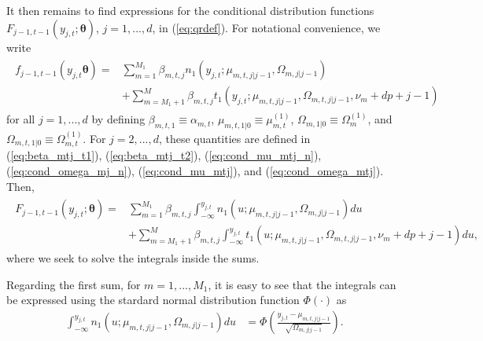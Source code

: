 \documentclass[nojss]{jss}
\begin{document}
\begin{appendix}
It then remains to find expressions for the conditional distribution functions $F_{j-1,t-1}(y_{j,t};\boldsymbol{\theta})$, $j=1,...,d$, in (\ref{eq:qrdef}).  For notational convenience, we write
\begin{align}
\begin{aligned}
f_{j-1,t-1}(y_{j,t}\boldsymbol{\theta}) =& \sum_{m=1}^{M_1}\beta_{m,t,j}n_1(y_{j,t};\mu_{m,t,j|j-1},\Omega_{m,j|j-1}) \\
&+ \sum_{m=M_1 + 1}^{M}\beta_{m,t,j}t_1(y_{j,t};\mu_{m,t,j|j-1},\Omega_{m,t,j|j-1},\nu_m + dp + j - 1)
\end{aligned}
\end{align}
for all $j=1,...,d$ by defining $\beta_{m,t,1}\equiv \alpha_{m,t}$,  $\mu_{m,t,1|0}\equiv \mu_{m,t}^{(1)}$,  $\Omega_{m,1|0}\equiv \Omega_{m}^{(1)}$, and $\Omega_{m,t,1|0}\equiv \Omega_{m,t}^{(1)}$.  For $j=2,...,d$,  these quantities are defined in (\ref{eq:beta_mtj_t1}), (\ref{eq:beta_mtj_t2}), (\ref{eq:cond_mu_mtj_n}), (\ref{eq:cond_omega_mj_n}), (\ref{eq:cond_mu_mtj}), and (\ref{eq:cond_omega_mtj}). Then,
\begin{align}
\begin{aligned}
F_{j-1,t-1}(y_{j,t};\boldsymbol{\theta})=&\sum_{m=1}^{M_1}\beta_{m,t,j}\int_{-\infty}^{y_{j,t}}n_1(u;\mu_{m,t,j|j-1},\Omega_{m,j|j-1})du \\
&+\sum_{m=M_1+1}^{M}\beta_{m,t,j}\int_{-\infty}^{y_{j,t}}t_1(u;\mu_{m,t,j|j-1},\Omega_{m,t,j|j-1},\nu_m + dp + j - 1)du,
\end{aligned}
\end{align}
where we seek to solve the integrals inside the sums.

Regarding the first sum,  for $m=1,...,M_1$,  it is easy to see that the integrals can be expressed using the stardard normal distribution function $\Phi(\cdot)$ as
\begin{align}
\int_{-\infty}^{y_{j,t}}n_1(u;\mu_{m,t,j|j-1},\Omega_{m,j|j-1})du &= \Phi\left(\frac{y_{j,t}-\mu_{m,t,j|j-1}}{\sqrt{\Omega_{m,j|j-1}}}\right).
\end{align}


\end{appendix}
\end{document}
